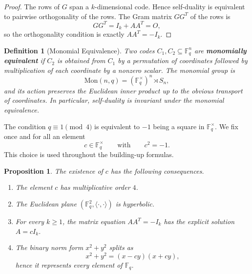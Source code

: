 \documentclass[12pt]{article}
\newtheorem{defn}{Definition}[section]
\newtheorem{prop}[theorem]{Proposition}
\newcommand{\F}{\mathbb{F}}
\newcommand{\Mon}{\mathrm{Mon}}
\begin{document}
\begin{proof}
The rows of $G$ span a $k$-dimensional code. Hence self-duality is equivalent to pairwise orthogonality of the rows. The Gram matrix $GG^T$ of the rows is
\[
GG^T = I_k + AA^T = O,
\]
so the orthogonality condition is exactly $AA^T = -I_k$.
\end{proof}

\begin{defn}[Monomial Equivalence]\label{def:mon-equiv}
{\rm
Two codes $C_1, C_2 \subseteq \F_q^n$ are \textbf{monomially equivalent} if $C_2$ is obtained from $C_1$ by a permutation of coordinates followed by multiplication of each coordinate by a nonzero scalar. The monomial group is
\[
\Mon(n,q) = (\F_q^\times)^n \rtimes S_n,
\]
and its action preserves the Euclidean inner product up to the obvious transport of coordinates. In particular, self-duality is invariant under the monomial equivalence.
}
\end{defn}




The condition $q \equiv 1 \pmod 4$ is equivalent to $-1$ being a square in $\F_q^\times$. We fix once and for all an element
\[
c \in \F_q^\times \qquad \text{with} \qquad c^2 = -1.
\]
This choice is used throughout the building-up formulas.

\begin{prop}\label{prop:split-consequences}
The existence of $c$ has the following consequences.
\begin{enumerate}[label=(\roman*)]
\item The element $c$ has multiplicative order $4$.
\item The Euclidean plane $(\F_q^2,\langle \cdot,\cdot\rangle)$ is hyperbolic.
\item For every $k \ge 1$, the matrix equation $AA^T = -I_k$ has the explicit solution $A=cI_k$.
\item The binary norm form $x^2+y^2$ splits as
\[
x^2+y^2 = (x-cy)(x+cy),
\]
hence it represents every element of\/ $\F_q$.
\end{enumerate}
\end{prop}

\end{document}
